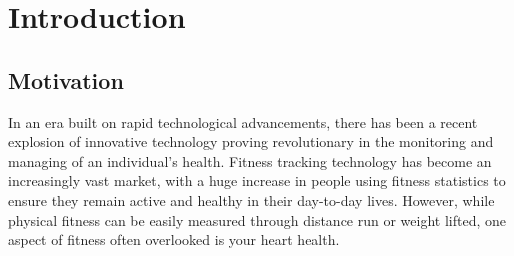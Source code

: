 \documentclass{l4proj}
\begin{document}
%
%
%
%
%
%
%
%
\chapter{Introduction}


\section{Motivation}

In an era built on rapid technological advancements, there has been a recent explosion of innovative technology proving revolutionary in the monitoring and managing of an individual’s health. Fitness tracking technology has become an increasingly vast market, with a huge increase in people using fitness statistics to ensure they remain active and healthy in their day-to-day lives. However, while physical fitness can be easily measured through distance run or weight lifted, one aspect of fitness often overlooked is your heart health. 
\end{document}
